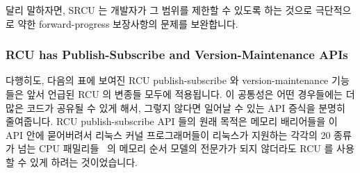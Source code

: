 달리 말하자면, SRCU 는 개발자가 그 범위를 제한할 수 있도록 하는 것으로
극단적으로 약한 forward-progress 보장사항의 문제를 보완합니다.
\iffalse

In other words, SRCU compensate for their extremely weak
forward-progress guarantees by permitting the developer to restrict
their scope.
\fi

\subsubsection{RCU has Publish-Subscribe and Version-Maintenance APIs}
\label{sec:defer:RCU has Publish-Subscribe and Version-Maintenance APIs}

다행히도, 다음의 표에 보여진 RCU publish-subscribe 와 version-maintenance
기능들은 앞서 언급된 RCU 의 변종들 모두에 적용됩니다.
이 공통성은 어떤 경우들에는 더 많은 코드가 공유될 수 있게 해서, 그렇지 않다면
일어날 수 있는 API 증식을 분명히 줄여줍니다.
RCU publish-subscribe API 들의 원래 목적은 메모리 배리어들을 이 API 안에
묻어버려서 리눅스 커널 프로그래머들이 리눅스가 지원하는 각각의 20 종류가 넘는
CPU 패밀리들~\cite{Spraul01} 의 메모리 순서 모델의 전문가가 되지 않더라도 RCU
를 사용할 수 있게 하려는 것이었습니다.
\iffalse

Fortunately, the RCU publish-subscribe and version-maintenance
primitives shown in the following
table apply to all of the variants of RCU discussed above.
This commonality can in some cases allow more code to be shared,
which certainly reduces the API proliferation that would otherwise
occur.
The original purpose of the RCU publish-subscribe APIs was to
bury memory barriers into these APIs, so that Linux kernel
programmers could use RCU without needing to become expert on
the memory-ordering models of each of the 20+ CPU families
that Linux supports~\cite{Spraul01}.
\fi

